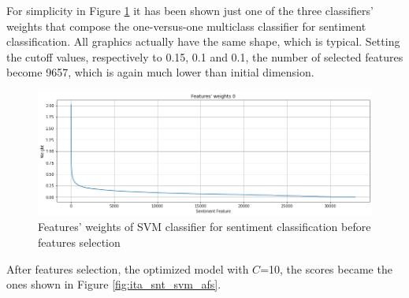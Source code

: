 For simplicity in Figure \ref{fig:ita_snt_svm_fs} it has been shown just one of the three classifiers' weights that compose the one-versus-one multiclass classifier for sentiment classification. All graphics actually have the same shape, which is typical. Setting the cutoff values, respectively to 0.15, 0.1 and 0.1, the number of selected features become 9657, which is again much lower than initial dimension.

\begin{figure}[H]
	\centering
	\includegraphics[width=\textwidth]{figures/conf_matrices/ita_snt_svm/ita_snt_svm_fs.png}
	\caption{Features' weights of SVM classifier for sentiment classification before features selection}
	\label{fig:ita_snt_svm_fs}
\end{figure}

After features selection, the optimized model with $C$=10, the scores became the ones shown in Figure \ref{fig:ita_snt_svm_afs}.

